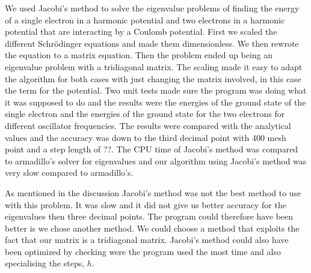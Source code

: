 
We used Jacobi's method to solve the eigenvalue problems of finding the energy of a single electron in a harmonic potential and two electrons in a harmonic potential that are interacting by a Coulomb potential. First we scaled the different Schrödinger equations and made them dimensionless. We then rewrote the equation to a matrix equation. Then the problem ended up being an eigenvalue problem with a tridiagonal matrix. The scaling made it easy to adapt the algorithm for both cases  with just changing the matrix involved, in this case the term for the potential. Two unit tests made sure the program was doing what it was supposed to do and the results were the energies of the ground state of the single electron and the energies of the ground state for the two electrons for different oscillator frequencies. The results were compared with the analytical values and the accuracy was down to the third decimal point with 400 mesh point and a step length of ??. The CPU time of Jacobi's method was compared to armadillo's solver for eigenvalues and our algorithm using Jacobi's method was very slow compared to armadillo's. 

As mentioned in the discussion Jacobi's method was not the best method to use with this problem. It was slow and it did not give us better accuracy for the eigenvalues then three decimal points. The program could therefore have been better is we chose another method. We could choose a method that exploits the fact that our matrix is a tridiagonal matrix. Jacobi's method could also have been optimized by checking were the program used the most time and also specialising the steps, $h$.


